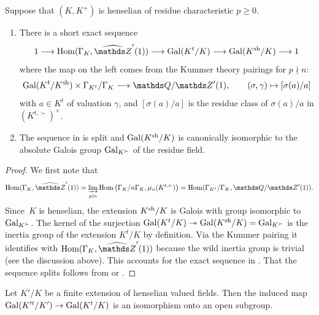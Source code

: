 \begin{lem} \label{lem:max tame extension}
    Suppose that $(K,K^+)$ is henselian of residue characteristic $p \ge 0$.
    \begin{enumerate}[ref=(\arabic*)]
        \item \label{lemitem:tame galois sequence}
        There is a short exact sequence
        \[
        1 \la \Hom(\Gamma_K,\hZ'(1)) \la \Gal(K^t/K) \la \Gal(K^\sh/K) \la 1
        \]
        where the map on the left comes from the Kummer theory pairings for $p \nmid n$:
        \[
        \Gal(K^t/K^\sh) \times \Gamma_{K^t}/\Gamma_K \la \bQ/\bZ'(1), 
        \qquad (\sigma,\gamma) \mapsto [\sigma(a)/a]
        \]
        with $a \in K^t$ of valuation $\gamma$, and $[\sigma(a)/a]$ is the residue class of $\sigma(a)/a$ in $(K^{t,\succ})^\times$.
  
        \item \label{lemitem:tame galois split}
        The sequence in  is split and 
        $\operatorname{Gal}(K^{\rm sh}/K)$ is canonically isomorphic to the absolute Galois group $\operatorname{Gal}_{K^\succ}$ of the residue field.
    \end{enumerate}
\end{lem}
\begin{proof}
    We first note that 
    \[
        \Hom(\Gamma_K,\hZ'(1)) = \varinjlim_{p \mid n} \Hom\big(\Gamma_K/n\Gamma_K,\mu_n(K^{t,\succ})\big) = \Hom(\Gamma_{K^t}/\Gamma_K,\bQ/\bZ'(1)).
    \]
     Since~$K$ is henselian, the extension $K^{\rm sh}/K$ is Galois with group isomorphic to $\operatorname{Gal}_{K^\succ}$.
    The kernel of the surjection $\operatorname{Gal}(K^t/K) \twoheadrightarrow \operatorname{Gal}(K^{\rm sh}/K) = \operatorname{Gal}_{K^\succ}$ is the inertia group of the extension $K^t/K$ by definition.
    Via the Kummer pairing it identifies with $\Hom(\Gamma_K,\hZ'(1))$ because the wild inertia group is trivial (see the discussion above).
    This accounts for the exact sequence in .
    That the sequence splits follows from  \cite{MelnikovTavgen85} or  \cite[Theorem~2.2]{KuhlmannPankRoquette}.
\end{proof}  

\begin{cor}
\label{cor:pitame injective for fields}
    Let $K'/K$ be a finite extension of henselian valued fields. Then the induced map $\operatorname{Gal}(K'^t/K') \to \operatorname{Gal}(K^t/K)$ is an isomorphism onto an open subgroup.
\end{cor}

